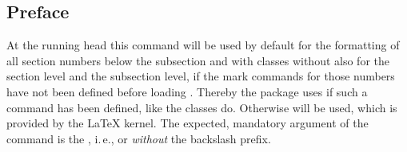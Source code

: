 \begin{Example}
\begin{lstcode}
  \tableofcontents
  \chapter*{Preface}
  \markboth{}{}
  \blindtext[20]
  \blinddocument
  
\end{lstcode}
    \end{Example}
  \fi
  \EndIndexGroup
\fi


  \begin{Declaration}
  \end{Declaration}
  At the running head this command will be used by default for the formatting
  of all section numbers below the subsection and with classes without
   also for the section level and the subsection
  level, if the mark commands for those numbers have not been defined before
  loading . Thereby the package uses
   if such a command has been defined, like the
  \KOMAScript{} classes do. Otherwise  will be used,
  which is provided by the \LaTeX{} kernel. The expected, mandatory argument
  of the command is the , i.\,e.,
   or  \emph{without} the backslash prefix.

